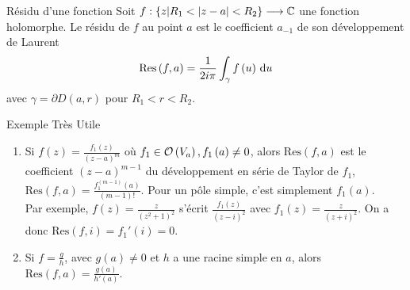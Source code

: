 \documentclass{cours}
\begin{document}
\newcommand{\Res}{\mathrm{Res}}

\begin{définition}
	{Résidu d'une fonction}{}
	Soit $f : \left\{z \middle| R_{1}  < \left|z - a\right| < R_{2}\right\} \longrightarrow \mathbb{C}$ une fonction holomorphe.
	Le résidu de $f$ au point $a$ est le coefficient $a_{- 1}$ de son développement de Laurent
	\begin{equation*}
		\Res\left(f, a\right) = \frac{1}{2i\pi}\int_{\gamma}f\left(u\right) \d u
	\end{equation*}
	avec $\gamma = \partial D\left(a, r\right)$ pour $R_{1} < r < R_{2}$.
\end{définition}


\begin{propositionfr}
	{Exemple Très Utile}{}
	\begin{enumerate}
		\item Si $f\left(z\right) = \frac{f_{1}\left(z\right)}{\left(z - a\right)^{m}}$ où $f_{1} \in \mathcal{O}\left(V_{a}\right), f_{1}\left(a\right) \neq 0$, 
			alors $\Res\left(f, a\right)$ est le coefficient $\left(z - a\right)^{m - 1}$ du développement en série de Taylor de $f_{1}$, 
			$\Res\left(f, a\right) = \frac{f_{1}^{\left(m - 1\right)}\left(a\right)}{\left(m - 1\right)!}$.
			Pour un pôle simple, c'est simplement $f_{1}\left(a\right)$.\\
			Par exemple, $f\left(z\right) = \frac{z}{\left(z^{2} + 1\right)^{2}}$ s'écrit $\frac{f_{1}\left(z\right)}{\left(z - i\right)^{2}}$ avec $f_{1}\left(z\right) = \frac{z}{\left(z + i\right)^{2}}$. On a donc $\Res\left(f, i\right) = f_{1}'\left(i\right) = 0$.
		\item Si $f = \frac{g}{h}$, avec $g\left(a\right) \neq 0$ et $h$ a une racine simple en $a$, 
			alors $\Res\left(f, a\right) = \frac{g\left(a\right)}{h'\left(a\right)}$.
	\end{enumerate}
\end{propositionfr}
\end{document}

